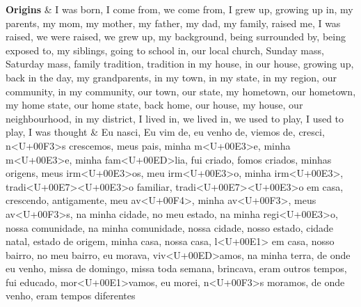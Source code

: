 \documentclass[
  12pt,
]{article}
\begin{document}
\begin{landscape}
\begin{longtabu}
\textbf{Origins} & I was born, I come from, we come from, I grew up, growing up in, my parents, my mom, my mother, my father, my dad, my family, raised me, I was raised, we were raised, we grew up, my background, being surrounded by, being exposed to, my siblings, going to school in, our local church, Sunday mass, Saturday mass, family tradition, tradition in my house, in our house, growing up, back in the day, my grandparents, in my town, in my state, in my region, our community, in my community, our town, our state, my hometown, our hometown, my home state, our home state, back home, our house, my house, our neighbourhood, in my district, I lived in, we lived in, we used to play, I used to play, I was thought & Eu nasci, Eu vim de, eu venho de, viemos de, cresci, n<U+00F3>s crescemos, meus pais, minha m<U+00E3>e, minha m<U+00E3>e, minha fam<U+00ED>lia, fui criado, fomos criados, minhas origens, meus irm<U+00E3>os, meu irm<U+00E3>o, minha irm<U+00E3>, tradi<U+00E7><U+00E3>o familiar, tradi<U+00E7><U+00E3>o em casa, crescendo, antigamente, meu av<U+00F4>, minha av<U+00F3>, meus av<U+00F3>s, na minha cidade, no meu estado, na minha regi<U+00E3>o, nossa comunidade, na minha comunidade, nossa cidade, nosso estado, cidade natal, estado de origem, minha casa, nossa casa, l<U+00E1> em casa, nosso bairro, no meu bairro, eu morava, viv<U+00ED>amos, na minha terra, de onde eu venho, missa de domingo, missa toda semana, brincava, eram outros tempos, fui educado, mor<U+00E1>vamos, eu morei, n<U+00F3>s moramos, de onde venho, eram tempos diferentes\\
\addlinespace

\end{longtabu}
\end{landscape}
\end{document}
